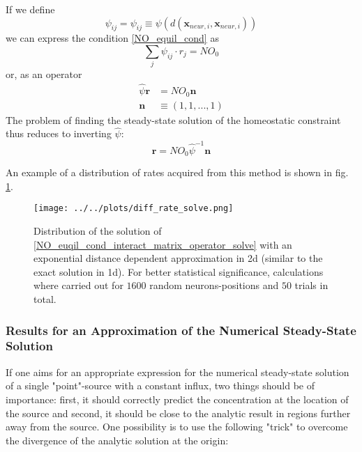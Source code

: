 \documentclass[10pt,a4paper]{article}
\begin{document}
If we define
\begin{equation}
\psi_{ij} = \psi_{ij} \equiv \psi (d(\mathbf{x}_{neur,i},\mathbf{x}_{neur,i}))
\label{interact_matrix_elements}
\end{equation}
we can express the condition \eqref{NO_equil_cond} as
\begin{equation}
\sum_j \psi_{ij}\cdot r_j = NO_0
\label{NO_equil_cond_interact_matrix}
\end{equation}
or, as an operator
\begin{align}
\hat{\psi}\mathbf{r} &= NO_0 \mathbf{n} \label{NO_equil_cond_interact_matrix_operator} \\
\mathbf{n}&\equiv (1,1,...,1)
\end{align}
The problem of finding the steady-state solution of the homeostatic constraint thus reduces to inverting $\hat{\psi}$:
\begin{equation}
\mathbf{r} = NO_0 \hat{\psi}^{-1} \mathbf{n}
\label{NO_euqil_cond_interact_matrix_operator_solve}
\end{equation}

An example of a distribution of rates acquired from this method is shown in fig. \ref{rate_dist_interact_matrix}.

\begin{figure}
\texttt{[image: ../../plots/diff\_rate\_solve.png]}
\caption{Distribution of the solution of \eqref{NO_euqil_cond_interact_matrix_operator_solve} with an exponential distance dependent approximation in 2d (similar to the exact solution in 1d). For better statistical significance, calculations where carried out for $1600$ random neurons-positions and $50$ trials in total.}
\label{rate_dist_interact_matrix}
\end{figure}

\subsubsection{Results for an Approximation of the Numerical Steady-State Solution}

If one aims for an appropriate expression for the numerical steady-state solution of a single "point"-source with a constant influx, two things should be of importance: first, it should correctly predict the concentration at the location of the source and second, it should be close to the analytic result in regions further away from the source. One possibility is to use the following "trick" to overcome the divergence of the analytic solution at the origin:
\end{document}
